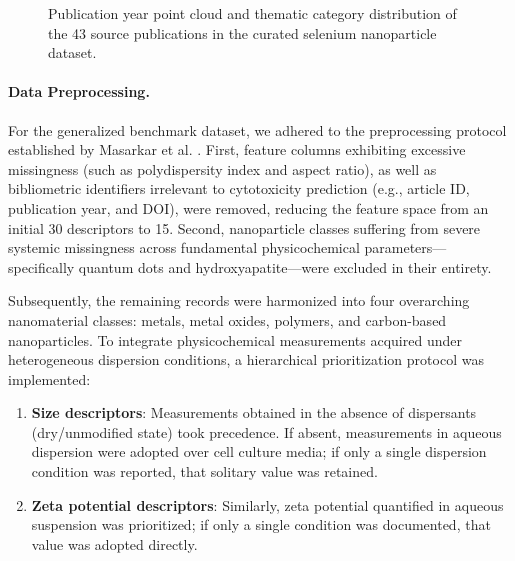 \begin{figure}[H]
  \vspace{0.8em}

  \caption{Publication year point cloud and thematic category distribution of the 43 source publications in the curated selenium nanoparticle dataset.}
  \label{fig:senp-literature-cloud}
\end{figure}

\paragraph{Data Preprocessing.}
For the generalized benchmark dataset, we adhered to the preprocessing protocol established by Masarkar et al. \cite{masarkar2024}. First, feature columns exhibiting excessive missingness (such as polydispersity index and aspect ratio), as well as bibliometric identifiers irrelevant to cytotoxicity prediction (e.g., article ID, publication year, and DOI), were removed, reducing the feature space from an initial 30 descriptors to 15. Second, nanoparticle classes suffering from severe systemic missingness across fundamental physicochemical parameters—specifically quantum dots and hydroxyapatite—were excluded in their entirety.

Subsequently, the remaining records were harmonized into four overarching nanomaterial classes: metals, metal oxides, polymers, and carbon-based nanoparticles. To integrate physicochemical measurements acquired under heterogeneous dispersion conditions, a hierarchical prioritization protocol was implemented:

\begin{enumerate}
  \item \textbf{Size descriptors}: Measurements obtained in the absence of dispersants (dry/unmodified state) took precedence. If absent, measurements in aqueous dispersion were adopted over cell culture media; if only a single dispersion condition was reported, that solitary value was retained.

  \item \textbf{Zeta potential descriptors}: Similarly, zeta potential quantified in aqueous suspension was prioritized; if only a single condition was documented, that value was adopted directly.
\end{enumerate}

